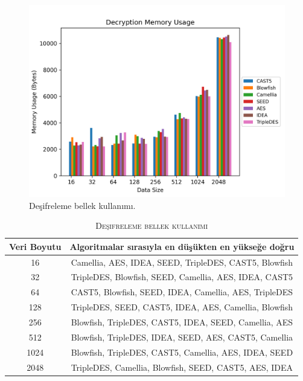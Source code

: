 \documentclass[conference, a4paper]{IEEEtran}
\begin{document}
    \begin{figure}[H]
    \centering
    \shorthandoff{=}  
    \includegraphics[scale=0.52]{fig6.png}
    \shorthandon{=} 
    \caption{Deşifreleme bellek kullanımı.}
    \label{sekil6}
    \end{figure}

    \begin{table}[h]
        \centering
        \caption{\textsc{Deşifreleme bellek kullanımı}}
        \label{tablo3}
        \begin{tabular}{|c|c|}
            \hline
                Veri Boyutu & Algoritmalar sırasıyla en düşükten en yükseğe doğru \\
            \hline
            16 & Camellia, AES, IDEA, SEED, TripleDES, CAST5, Blowfish \\
            \hline
            32 & TripleDES, Blowfish, SEED, Camellia, AES, IDEA, CAST5 \\
            \hline
            64 & CAST5, Blowfish, SEED, IDEA, Camellia, AES, TripleDES \\
            \hline
            128 & TripleDES, SEED, CAST5, IDEA, AES, Camellia, Blowfish \\
            \hline
            256 & Blowfish, TripleDES, CAST5, IDEA, SEED, Camellia, AES \\
            \hline
            512 & Blowfish, TripleDES, IDEA, SEED, AES, CAST5, Camellia \\
            \hline
            1024 & Blowfish, TripleDES, CAST5, Camellia, AES, IDEA, SEED \\
            \hline
            2048 & TripleDES, Camellia, Blowfish, SEED, CAST5, AES, IDEA \\
            \hline
        \end{tabular}
    \end{table}    
\end{document}
